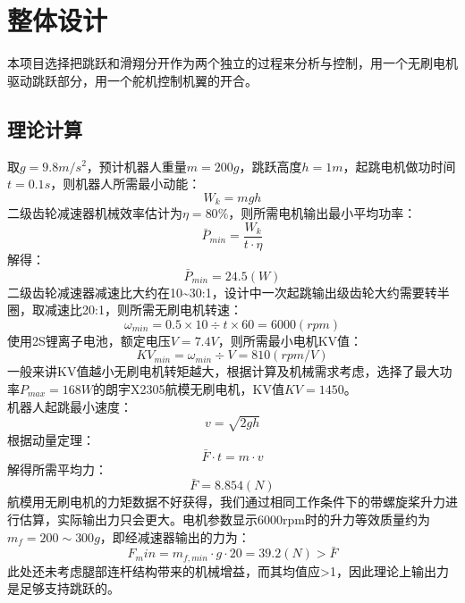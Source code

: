 
\chapter{整体设计}
\label{cha:chapter02}
本项目选择把跳跃和滑翔分开作为两个独立的过程来分析与控制，用一个无刷电机驱动跳跃部分，用一个舵机控制机翼的开合。
\section{理论计算}
\label{sec:calculations}
取$g=9.8m/s^2$，预计机器人重量$m=200g$，跳跃高度$h=1m$，起跳电机做功时间$t=0.1s$，则机器人所需最小动能：
\begin{equation}
\label{equ:chap2:W_calc}
W_k=mgh
\end{equation}
二级齿轮减速器机械效率估计为$\eta=80\%$，则所需电机输出最小平均功率：
\begin{equation}
  \label{equ:chap2:P_calc}
  \bar{P}_{min}=\frac{W_k}{t·\eta}
  \end{equation}
解得：$$\bar{P}_{min}=24.5(W)$$
二级齿轮减速器减速比大约在10\sim30:1，设计中一次起跳输出级齿轮大约需要转半圈，取减速比20:1，则所需无刷电机转速：
$$\omega_{min}=0.5\times10\div t\times60=6000(rpm)$$
使用2S锂离子电池，额定电压$V=7.4V$，则所需最小电机KV值：
$$KV_{min}=\omega_{min}\div V=810(rpm/V)$$
一般来讲KV值越小无刷电机转矩越大，根据计算及机械需求考虑，选择了最大功率$P_{max}=168W$的朗宇X2305航模无刷电机，KV值$KV=1450$。\\
机器人起跳最小速度：
\begin{equation}
  \label{equ:chap2:v_calc}
  v=\sqrt{2gh}
  \end{equation}
根据动量定理：
\begin{equation}
  \label{equ:chap2:motion_principle}
  \bar{F}·t=m·v
  \end{equation}
解得所需平均力：$$\bar{F}=8.854(N)$$
航模用无刷电机的力矩数据不好获得，我们通过相同工作条件下的带螺旋桨升力进行估算，实际输出力只会更大。电机参数显示6000rpm时的升力等效质量约为$m_f=200\sim300g$，即经减速器输出的力为：$$F_min=m_{f,min}·g·20=39.2(N)>\bar{F}$$
此处还未考虑腿部连杆结构带来的机械增益，而其均值应>1，因此理论上输出力是足够支持跳跃的。
